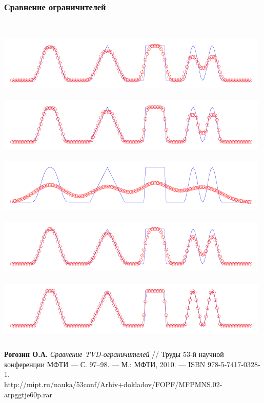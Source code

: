 \documentclass[ucs]{beamer}
\begin{document}
\begin{frame}
	\frametitle{Сравнение ограничителей}
	\begin{columns}
		\\
		\includegraphics[width=\textwidth]{conver/mc}\\
		\\
		\includegraphics[width=\textwidth]{conver/superbee}\\
		\\
		\includegraphics[width=\textwidth]{conver/first}\\
		\\
		\includegraphics[width=\textwidth]{conver/third_g}\\
		\\
		\includegraphics[width=\textwidth]{conver/superbee_g}\\
	\end{columns}
	\begin{block}{}\scriptsize
		\textbf{Рогозин О.А.} \textit{Сравнение TVD-ограничителей}
		// Труды 53-й научной конференции МФТИ — С. 97–98. —
		М.: МФТИ, 2010. — ISBN 978-5-7417-0328-1. \\ \smallskip\tiny
		http://mipt.ru/nauka/53conf/Arhiv+dokladov/FOPF/MFPMNS.02-arpggtje60p.rar
	\end{block}
\end{frame}
\end{document}
